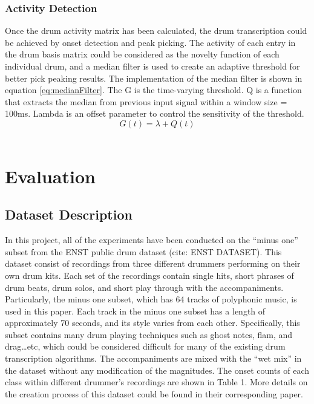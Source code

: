 \documentclass{article}
\begin{document}
\subsubsection{Activity Detection}\label{subsubsec:activity detection}
Once the drum activity matrix has been calculated, the drum transcription could be achieved by onset detection and peak picking. The activity of each entry in the drum basis matrix could be considered as the novelty function of each individual drum, and a median filter is used to create an adaptive threshold for better pick peaking results. The implementation of the median filter is shown in equation \eqref{eq:medianFilter}. The G is the time-varying threshold. Q is a function that extracts the median from previous input signal within a window size = 100ms. Lambda is an offset parameter to control the sensitivity of the threshold.
\begin{equation}
G(t) = \lambda + Q(t)
\label{eq:medianFilter}
\end{equation}\\

\section{Evaluation}\label{sec:Evaluation}
\subsection{Dataset Description}\label{subsec:dataset description}

In this project, all of the experiments have been conducted on the “minus one” subset from the ENST public drum dataset (cite: ENST DATASET). This dataset consist of recordings from three different drummers performing on their own drum kits. Each set of the recordings contain single hits, short phrases of drum beats, drum solos, and short play through with the accompaniments. Particularly, the minus one subset, which has 64 tracks of polyphonic music, is used in this paper. Each track in the minus one subset has a length of approximately 70 seconds, and its style varies from each other. Specifically, this subset contains many drum playing techniques such as ghost notes, flam, and drag…etc, which could be considered difficult for many of the existing drum transcription algorithms. The accompaniments are mixed with the “wet mix” in the dataset without any modification of the magnitudes. The onset counts of each class within different drummer’s recordings are shown in Table 1. More details on the creation process of this dataset could be found in their corresponding paper.  
\end{document}
